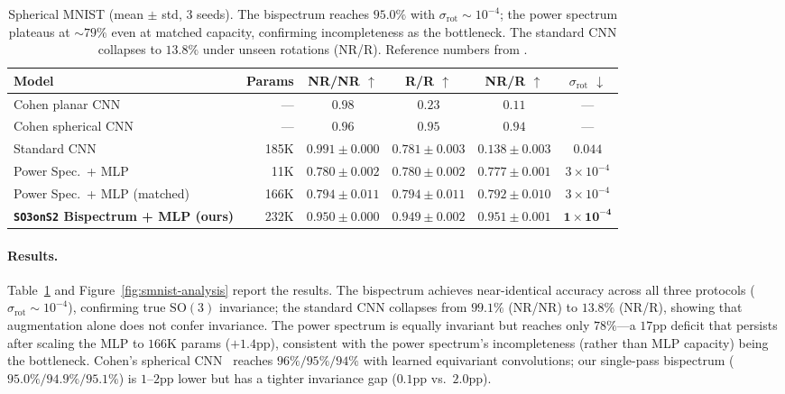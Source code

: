 \documentclass{article}
\theoremstyle{definition}
\theoremstyle{remark}
\newcommand{\SO}{\mathrm{SO}}
\theoremstyle{definition}
\begin{document}
\begin{table}[tbp]
  \caption{Spherical MNIST (mean $\pm$ std, 3 seeds). The bispectrum
    reaches $95.0\%$ with $\sigma_{\mathrm{rot}} \sim 10^{-4}$; the
    power spectrum plateaus at ${\sim}79\%$ even at matched capacity,
    confirming incompleteness as the bottleneck. The standard CNN
    collapses to $13.8\%$ under unseen rotations (NR/R).
    Reference numbers from \citet{cohen2018spherical}.}
  \label{tab:smnist-results}
  \centering
  \small
  \setlength{\tabcolsep}{3pt}
  \begin{tabular}{lrcccc}
    \toprule
    Model & Params & NR/NR $\uparrow$ & R/R $\uparrow$ & NR/R $\uparrow$
      & $\sigma_{\mathrm{rot}}$ $\downarrow$ \\
    \midrule
    Cohen planar CNN & --- & $0.98$ & $0.23$ & $0.11$ & --- \\
    Cohen spherical CNN & --- & $0.96$ & $0.95$ & $0.94$ & --- \\
    \midrule
    Standard CNN & 185K
      & $\mathbf{0.991 {\pm} 0.000}$ & $0.781 {\pm} 0.003$ & $0.138 {\pm} 0.003$
      & $0.044$ \\
    Power Spec.\ + MLP & 11K
      & $0.780 {\pm} 0.002$ & $0.780 {\pm} 0.002$ & $0.777 {\pm} 0.001$
      & $3{\times}10^{-4}$ \\
    Power Spec.\ + MLP (matched) & 166K
      & $0.794 {\pm} 0.011$ & $0.794 {\pm} 0.011$ & $0.792 {\pm} 0.010$
      & $3{\times}10^{-4}$ \\
    \textbf{\texttt{SO3onS2} Bispectrum + MLP (ours)} & 232K
      & $0.950 {\pm} 0.000$ & $\mathbf{0.949 {\pm} 0.002}$
      & $\mathbf{0.951 {\pm} 0.001}$ & $\mathbf{1{\times}10^{-4}}$ \\
    \bottomrule
  \end{tabular}
\end{table}

\paragraph{Results.}
Table~\ref{tab:smnist-results} and
Figure~\ref{fig:smnist-analysis} report the results.
The bispectrum achieves near-identical accuracy across all three
protocols ($\sigma_{\mathrm{rot}}{\sim}10^{-4}$), confirming true
$\SO(3)$ invariance; the standard CNN collapses from $99.1\%$
(NR/NR) to $13.8\%$ (NR/R), showing that augmentation alone does not
confer invariance. The power spectrum is equally invariant but
reaches only $78\%$---a $17$pp deficit that persists after scaling
the MLP to $166$K params (${+}1.4$pp), consistent with the power
spectrum's incompleteness (rather than MLP capacity) being the
bottleneck. Cohen's spherical CNN~\citep{cohen2018spherical} reaches
$96\%/95\%/94\%$ with learned equivariant convolutions; our
single-pass bispectrum ($95.0\%/94.9\%/95.1\%$) is $1$--$2$pp lower
but has a tighter invariance gap ($0.1$pp vs.\ $2.0$pp).
\end{document}
